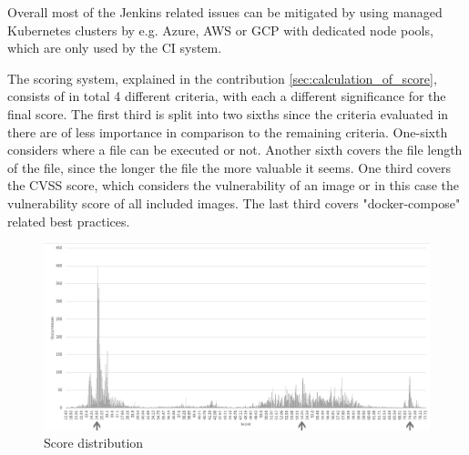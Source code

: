 Overall most of the Jenkins related issues can be mitigated by using managed Kubernetes clusters by e.g. Azure, AWS or GCP with dedicated node pools, which are only used by the CI system.

The scoring system, explained in the contribution \ref{sec:calculation_of_score}, consists of in total 4 different criteria, with each a different significance for the final score. The first third is split into two sixths since the criteria evaluated in there are of less importance in comparison to the remaining criteria. One-sixth considers where a file can be executed or not. Another sixth covers the file length of the file, since the longer the file the more valuable it seems. One third covers the CVSS score, which considers the vulnerability of an image or in this case the vulnerability score of all included images. The last third covers "docker-compose" related best practices.

\begin{figure}[H]
    \centering
    \includegraphics[scale=0.4]{graphics/deployment_score_bw.png}
    \caption{Score distribution}
    \label{fig:deployment_score}
\end{figure}

